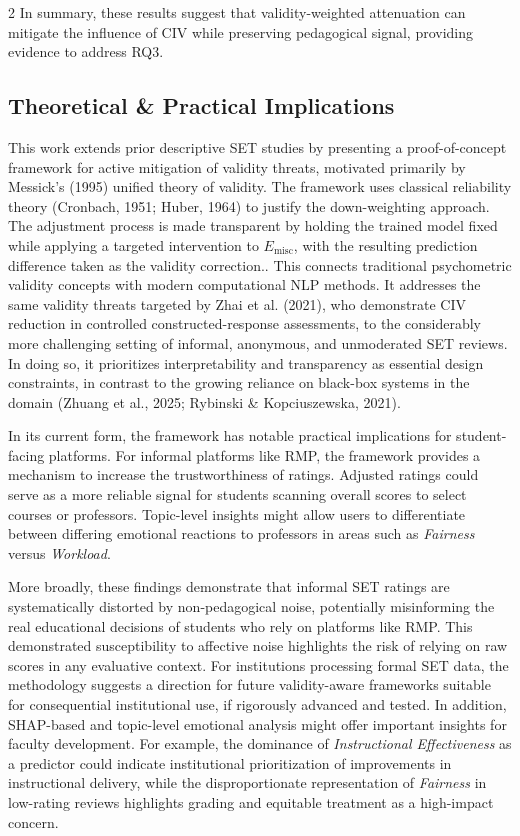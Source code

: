 \documentclass{article}
\begin{document}
\begin{multicols*}{2}
In summary, these results suggest that validity-weighted attenuation can mitigate the influence of CIV while preserving pedagogical signal, providing evidence to address RQ3.

\subsection{Theoretical \& Practical Implications}

This work extends prior descriptive SET studies by presenting a proof-of-concept framework for active mitigation of validity threats, motivated primarily by Messick's (1995) unified theory of validity. The framework uses classical reliability theory (Cronbach, 1951; Huber, 1964) to justify the down-weighting approach. The adjustment process is made transparent by holding the trained model fixed while applying a targeted intervention to $E_\text{misc}$, with the resulting prediction difference taken as the validity correction.. This connects traditional psychometric validity concepts with modern computational NLP methods. It addresses the same validity threats targeted by Zhai et al. (2021), who demonstrate CIV reduction in controlled constructed-response assessments, to the considerably more challenging setting of informal, anonymous, and unmoderated SET reviews. In doing so, it prioritizes interpretability and transparency as essential design constraints, in contrast to the growing reliance on black-box systems in the domain (Zhuang et al., 2025; Rybinski \& Kopciuszewska, 2021).

In its current form, the framework has notable practical implications for student-facing platforms. For informal platforms like RMP, the framework provides a mechanism to increase the trustworthiness of ratings. Adjusted ratings could serve as a more reliable signal for students scanning overall scores to select courses or professors. Topic-level insights might allow users to differentiate between differing emotional reactions to professors in areas such as \textit{Fairness} versus \textit{Workload}.

More broadly, these findings demonstrate that informal SET ratings are systematically distorted by non-pedagogical noise, potentially misinforming the real educational decisions of students who rely on platforms like RMP. This demonstrated susceptibility to affective noise highlights the risk of relying on raw scores in any evaluative context. For institutions processing formal SET data, the methodology suggests a direction for future validity-aware frameworks suitable for consequential institutional use, if rigorously advanced and tested. In addition, SHAP-based and topic-level emotional analysis might offer important insights for faculty development. For example, the dominance of \textit{Instructional Effectiveness} as a predictor could indicate institutional prioritization of improvements in instructional delivery, while the disproportionate representation of \textit{Fairness} in low-rating reviews highlights grading and equitable treatment as a high-impact concern.


\end{multicols*}
\end{document}
